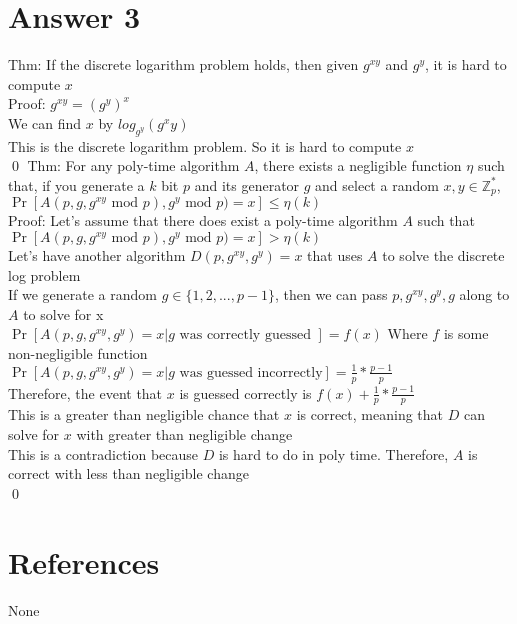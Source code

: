 \documentclass[11pt]{article}
\theoremstyle{definition}
\begin{document}
\section*{Answer 3}
Thm: If the discrete logarithm problem holds, then given $g^{xy}$ and $g^{y}$, it is hard to compute $x$\\
\newline
Proof: $g^{xy} = (g^y)^x$\\
We can find $x$ by $log_{g^y}(g^xy)$\\
This is the discrete logarithm problem.  So it is hard to compute $x$\\
\qed
\newline
Thm: For any poly-time algorithm $A$, there exists a negligible function $\eta$ such that, if you generate a $k$ bit $p$ and its generator $g$ and select a random $x,y \in \mathbb{Z}_p^*$, $\Pr[A(p,g,g^{xy} \text { mod } p), g^y \text{ mod } p) = x] \le \eta(k)$\\
\newline
Proof: Let's assume that there does exist a poly-time algorithm $A$ such that $\Pr[A(p,g,g^{xy} \text { mod } p), g^y \text{ mod } p) = x] > \eta(k)$\\
Let's have another algorithm $D(p, g^{xy}, g^{y}) = x$ that uses $A$ to solve the discrete log problem\\
If we generate a random $g \in \{1,2,...,p-1\}$, then we can pass $p,g^{xy}, g^y, g$ along to $A$ to solve for x\\
$\Pr[A(p,g,g^{xy},g^y) = x | g \text{ was correctly guessed }] = f(x)$ Where $f$ is some non-negligible function\\
$\Pr[A(p,g,g^{xy},g^y) = x | g \text{ was guessed incorrectly}] = \frac{1}{p} * \frac{p-1}{p}$\\
Therefore, the event that $x$ is guessed correctly is $f(x) +  \frac{1}{p} * \frac{p-1}{p}$\\
This is a greater than negligible chance that $x$ is correct, meaning that $D$ can solve for $x$ with greater than negligible change\\
This is a contradiction because $D$ is hard to do in poly time.  Therefore, $A$ is correct with less than negligible change\\
\qed


\noindent\hrulefill


\section*{References}

None
\end{document}
